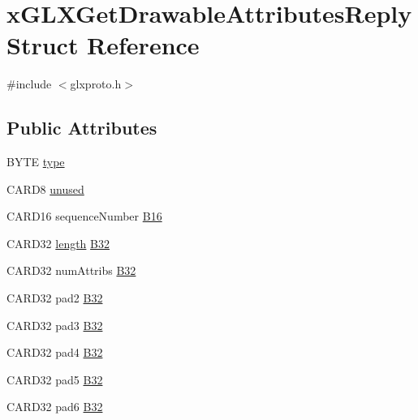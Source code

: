 \hypertarget{structx_g_l_x_get_drawable_attributes_reply}{}\section{x\+G\+L\+X\+Get\+Drawable\+Attributes\+Reply Struct Reference}
\label{structx_g_l_x_get_drawable_attributes_reply}


{\ttfamily \#include $<$glxproto.\+h$>$}

\subsection*{Public Attributes}
\begin{DoxyCompactItemize}
\item 
B\+Y\+TE \hyperlink{structx_g_l_x_get_drawable_attributes_reply_a8c2fb7a0677e23d9f5e8cec8f3cf6327}{type}
\item 
C\+A\+R\+D8 \hyperlink{structx_g_l_x_get_drawable_attributes_reply_a8676692ba44203aa2a721c28a6eef876}{unused}
\item 
C\+A\+R\+D16 sequence\+Number \hyperlink{structx_g_l_x_get_drawable_attributes_reply_ab1b582fca3c798393f10442145468c86}{B16}
\item 
C\+A\+R\+D32 \hyperlink{glcorearb_8h_ab9c919755bde3b34349e23a32b4e0fa7}{length} \hyperlink{structx_g_l_x_get_drawable_attributes_reply_ab9b2a45176d85086d4d39aea8769cc32}{B32}
\item 
C\+A\+R\+D32 num\+Attribs \hyperlink{structx_g_l_x_get_drawable_attributes_reply_a6d8cb9625ac1b41f201aea47e5239b03}{B32}
\item 
C\+A\+R\+D32 pad2 \hyperlink{structx_g_l_x_get_drawable_attributes_reply_aa5c0ae176fa5fff72958f5dfba32e608}{B32}
\item 
C\+A\+R\+D32 pad3 \hyperlink{structx_g_l_x_get_drawable_attributes_reply_ad798a3a3990a76ee1675a4075f24f48e}{B32}
\item 
C\+A\+R\+D32 pad4 \hyperlink{structx_g_l_x_get_drawable_attributes_reply_a3bcca9960e92856c67e8c853aec72770}{B32}
\item 
C\+A\+R\+D32 pad5 \hyperlink{structx_g_l_x_get_drawable_attributes_reply_a73a7aedac73f35f78a7ce3a388f9b3a6}{B32}
\item 
C\+A\+R\+D32 pad6 \hyperlink{structx_g_l_x_get_drawable_attributes_reply_a88b95bac17240e6c5172761cbccfcfe5}{B32}
\end{DoxyCompactItemize}


